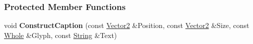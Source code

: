 \subsubsection*{Protected Member Functions}
\begin{DoxyCompactItemize}
\item 
\hypertarget{classphys_1_1UI_1_1Caption_ae1177e96a6946e76adc0774e208e9895}{
void {\bfseries ConstructCaption} (const \hyperlink{classphys_1_1Vector2}{Vector2} \&Position, const \hyperlink{classphys_1_1Vector2}{Vector2} \&Size, const \hyperlink{namespacephys_a460f6bc24c8dd347b05e0366ae34f34a}{Whole} \&Glyph, const \hyperlink{namespacephys_aa03900411993de7fbfec4789bc1d392e}{String} \&Text)}
\label{classphys_1_1UI_1_1Caption_ae1177e96a6946e76adc0774e208e9895}

\end{DoxyCompactItemize}
